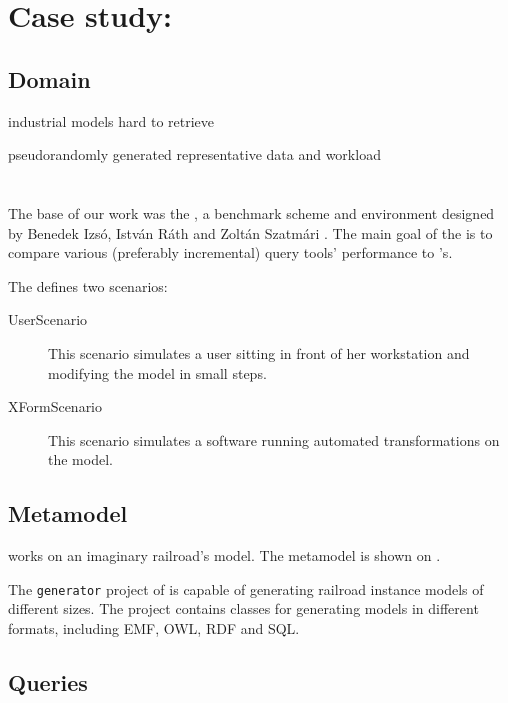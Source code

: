 \section{Case study: \tb{}}
\label{sec:trainbenchmark}

\subsection{Domain}

industrial models hard to retrieve

pseudorandomly generated representative data and workload




\section{\tb{}}

The base of our work was the \textit{\tb{}}, a benchmark scheme and environment designed by Benedek Izsó, István Ráth and Zoltán Szatmári \cite{?}. The main goal of the \tb{} is to compare various (preferably incremental) query tools' performance to \eiq's.

The \tb{} defines two scenarios:

\begin{description}
  \item[UserScenario] This scenario simulates a user sitting in front of her workstation and modifying the model in small steps.
  \item[XFormScenario] This scenario simulates a software running automated transformations on the model.
\end{description}

\subsection{Metamodel}

\tb{} works on an imaginary railroad's model. The metamodel is shown on .

The \texttt{generator} project of \tb{} is capable of generating railroad instance models of different sizes. The project contains classes for generating models in different formats, including EMF, OWL, RDF and SQL.

\subsection{Queries}


